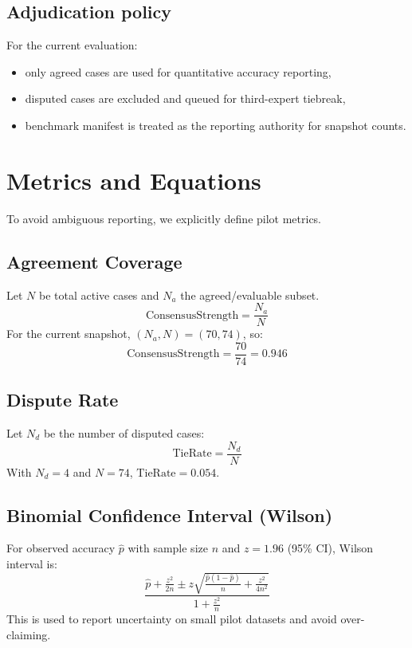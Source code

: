 \documentclass[11pt]{article}
\begin{document}
\subsection{Adjudication policy}
For the current evaluation:
\begin{itemize}[nosep]
  \item only agreed cases are used for quantitative accuracy reporting,
  \item disputed cases are excluded and queued for third-expert tiebreak,
  \item benchmark manifest is treated as the reporting authority for snapshot counts.
\end{itemize}

\section{Metrics and Equations}
To avoid ambiguous reporting, we explicitly define pilot metrics.

\subsection{Agreement Coverage}
Let $N$ be total active cases and $N_a$ the agreed/evaluable subset.
\begin{equation}
\mathrm{ConsensusStrength} = \frac{N_a}{N}
\label{eq:consensus_strength}
\end{equation}
For the current snapshot, $(N_a, N)=(70,74)$, so:
\begin{equation}
\mathrm{ConsensusStrength} = \frac{70}{74}=0.946
\end{equation}

\subsection{Dispute Rate}
Let $N_d$ be the number of disputed cases:
\begin{equation}
\mathrm{TieRate} = \frac{N_d}{N}
\label{eq:tierate}
\end{equation}
With $N_d=4$ and $N=74$, $\mathrm{TieRate}=0.054$.

\subsection{Binomial Confidence Interval (Wilson)}
For observed accuracy $\hat{p}$ with sample size $n$ and $z=1.96$ (95\% CI), Wilson interval is:
\begin{equation}
\frac{\hat{p} + \frac{z^2}{2n} \pm
z\sqrt{\frac{\hat{p}(1-\hat{p})}{n}+\frac{z^2}{4n^2}}}
{1+\frac{z^2}{n}}
\label{eq:wilson}
\end{equation}
This is used to report uncertainty on small pilot datasets and avoid over-claiming.
\end{document}
